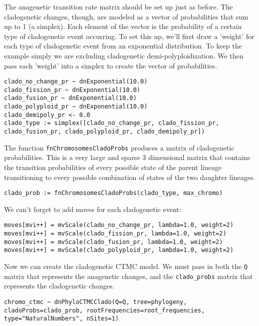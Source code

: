 The anagenetic transition rate matrix should be set up just as before.
The cladogenetic changes, though, are modeled as a vector of probabilities 
that sum up to 1 (a simplex). Each element of the vector is the 
probability of a certain type of cladogenetic event occurring.
To set this up, we'll first draw a 'weight' for each type of 
cladogenetic event from an exponential distribution. To keep the
example simply we are excluding cladogenetic demi-polyploidization.
We then pass each 'weight' into a simplex to create the vector
of probabilities.
{\tt \begin{snugshade*}
\begin{lstlisting}
clado_no_change_pr ~ dnExponential(10.0)
clado_fission_pr ~ dnExponential(10.0)
clado_fusion_pr ~ dnExponential(10.0)
clado_polyploid_pr ~ dnExponential(10.0)
clado_demipoly_pr <- 0.0
clado_type := simplex([clado_no_change_pr, clado_fission_pr, clado_fusion_pr, clado_polyploid_pr, clado_demipoly_pr])
\end{lstlisting}
\end{snugshade*}}
The function \texttt{fnChromosomesCladoProbs} 
produces a matrix of cladogenetic probabilities. This is a very
large and sparse 3 dimensional matrix that contains the transition probabilities 
of every possible state of the parent lineage transitioning to every possible 
combination of states of the two daughter lineages.
{\tt \begin{snugshade*}
\begin{lstlisting}
clado_prob := fnChromosomesCladoProbs(clado_type, max_chromo)
\end{lstlisting}
\end{snugshade*}}
We can't forget to add moves for each cladogenetic event:
{\tt \begin{snugshade*}
\begin{lstlisting}
moves[mvi++] = mvScale(clado_no_change_pr, lambda=1.0, weight=2)
moves[mvi++] = mvScale(clado_fission_pr, lambda=1.0, weight=2)
moves[mvi++] = mvScale(clado_fusion_pr, lambda=1.0, weight=2)
moves[mvi++] = mvScale(clado_polyploid_pr, lambda=1.0, weight=2)
\end{lstlisting}
\end{snugshade*}}
Now we can create the cladogenetic CTMC model.
We must pass in both the \texttt{Q} matrix that represents the anagenetic changes,
and the \texttt{clado\_probs} matrix that represents the cladogenetic changes.
{\tt \begin{snugshade*}
\begin{lstlisting}
chromo_ctmc ~ dnPhyloCTMCClado(Q=Q, tree=phylogeny, cladoProbs=clado_prob, rootFrequencies=root_frequencies, type="NaturalNumbers", nSites=1)
\end{lstlisting}
\end{snugshade*}}
